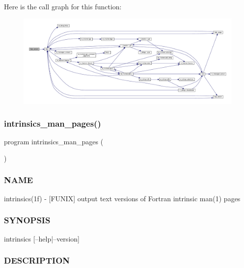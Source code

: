 Here is the call graph for this function\+:
\nopagebreak
\begin{figure}[H]
\begin{center}
\leavevmode
\includegraphics[width=350pt]{intrinsics_8f90_a39c21619b08a3c22f19e2306efd7f766_cgraph}
\end{center}
\end{figure}
\mbox{\label{intrinsics_8f90_a47ddb3e494b21f6cf5e2853dc6d266b0}} 
\subsubsection{\texorpdfstring{intrinsics\+\_\+man\+\_\+pages()}{intrinsics\_man\_pages()}}
{\footnotesize\ttfamily program intrinsics\+\_\+man\+\_\+pages (\begin{DoxyParamCaption}{ }\end{DoxyParamCaption})}



\subsubsection*{N\+A\+ME}

intrinsics(1f) -\/ \mbox{[}F\+U\+N\+IX\mbox{]} output text versions of Fortran intrinsic man(1) pages 

\subsubsection*{S\+Y\+N\+O\+P\+S\+IS}

\begin{DoxyVerb} intrinsics [--help|--version]
\end{DoxyVerb}


\subsubsection*{D\+E\+S\+C\+R\+I\+P\+T\+I\+ON}

